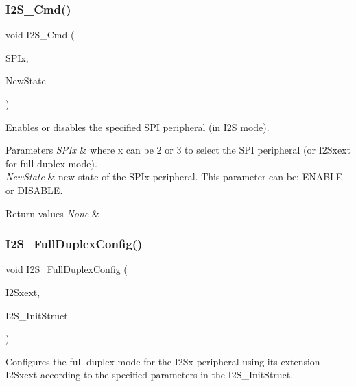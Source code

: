 \subsubsection{\texorpdfstring{I2\+S\+\_\+\+Cmd()}{I2S\_Cmd()}}
{\footnotesize\ttfamily void I2\+S\+\_\+\+Cmd (\begin{DoxyParamCaption}\item[{S\+P\+I\+\_\+\+Type\+Def $\ast$}]{S\+P\+Ix,  }\item[{Functional\+State}]{New\+State }\end{DoxyParamCaption})}



Enables or disables the specified S\+PI peripheral (in I2S mode). 


\begin{DoxyParams}{Parameters}
{\em S\+P\+Ix} & where x can be 2 or 3 to select the S\+PI peripheral (or I2\+Sxext for full duplex mode). \\
\hline
{\em New\+State} & new state of the S\+P\+Ix peripheral. This parameter can be\+: E\+N\+A\+B\+LE or D\+I\+S\+A\+B\+LE. \\
\hline
\end{DoxyParams}

\begin{DoxyRetVals}{Return values}
{\em None} & \\
\hline
\end{DoxyRetVals}
\mbox{\label{group___s_p_i_ga60082947bedfe9efc233405be2a7bec2}} 
\subsubsection{\texorpdfstring{I2\+S\+\_\+\+Full\+Duplex\+Config()}{I2S\_FullDuplexConfig()}}
{\footnotesize\ttfamily void I2\+S\+\_\+\+Full\+Duplex\+Config (\begin{DoxyParamCaption}\item[{S\+P\+I\+\_\+\+Type\+Def $\ast$}]{I2\+Sxext,  }\item[{\mbox{\hyperlink{struct_i2_s___init_type_def}{I2\+S\+\_\+\+Init\+Type\+Def}} $\ast$}]{I2\+S\+\_\+\+Init\+Struct }\end{DoxyParamCaption})}



Configures the full duplex mode for the I2\+Sx peripheral using its extension I2\+Sxext according to the specified parameters in the I2\+S\+\_\+\+Init\+Struct. 


